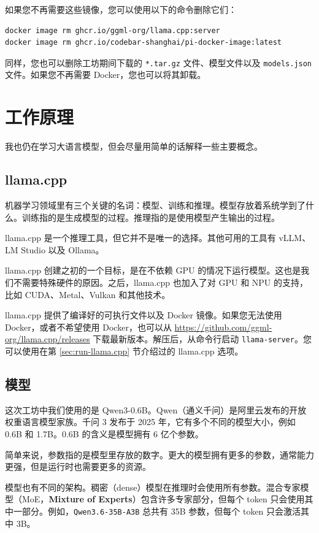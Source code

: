 \documentclass[a4paper,12pt]{article}
\begin{document}
如果您不再需要这些镜像，您可以使用以下的命令删除它们：

\begin{verbatim}
docker image rm ghcr.io/ggml-org/llama.cpp:server
docker image rm ghcr.io/codebar-shanghai/pi-docker-image:latest
\end{verbatim}

同样，您也可以删除工坊期间下载的 \texttt{*.tar.gz} 文件、模型文件以及 \texttt{models.json} 文件。如果您不再需要 Docker，您也可以将其卸载。

\section{工作原理}

我也仍在学习大语言模型，但会尽量用简单的话解释一些主要概念。

\subsection{llama.cpp}
\label{sec:llama.cpp}

机器学习领域里有三个关键的名词：模型、训练和推理。模型存放着系统学到了什么。训练指的是生成模型的过程。推理指的是使用模型产生输出的过程。

llama.cpp 是一个推理工具，但它并不是唯一的选择。其他可用的工具有 vLLM、LM Studio 以及 Ollama。

llama.cpp 创建之初的一个目标，是在不依赖 GPU 的情况下运行模型。这也是我们不需要特殊硬件的原因。之后，llama.cpp 也加入了对 GPU 和 NPU 的支持，比如 CUDA、Metal、Vulkan 和其他技术。

llama.cpp 提供了编译好的可执行文件以及 Docker 镜像。如果您无法使用 Docker，或者不希望使用 Docker，也可以从 \url{https://github.com/ggml-org/llama.cpp/releases} 下载最新版本。解压后，从命令行启动 \texttt{llama-server}。您可以使用在第 \ref{sec:run-llama.cpp} 节介绍过的 llama.cpp 选项。

\subsection{模型}
\label{sec:models}

这次工坊中我们使用的是 Qwen3-0.6B。Qwen（通义千问）是阿里云发布的开放权重语言模型家族。千问 3 发布于 2025 年，它有多个不同的模型大小，例如 0.6B 和 1.7B。0.6B 的含义是模型拥有 6 亿个参数。

简单来说，参数指的是模型里存放的数字。更大的模型拥有更多的参数，通常能力更强，但是运行时也需要更多的资源。

模型也有不同的架构。稠密（dense）模型在推理时会使用所有参数。混合专家模型（MoE，\textbf{Mixture of Experts}）包含许多专家部分，但每个 token 只会使用其中一部分。例如，\texttt{Qwen3.6-35B-A3B} 总共有 35B 参数，但每个 token 只会激活其中 3B。
\end{document}
